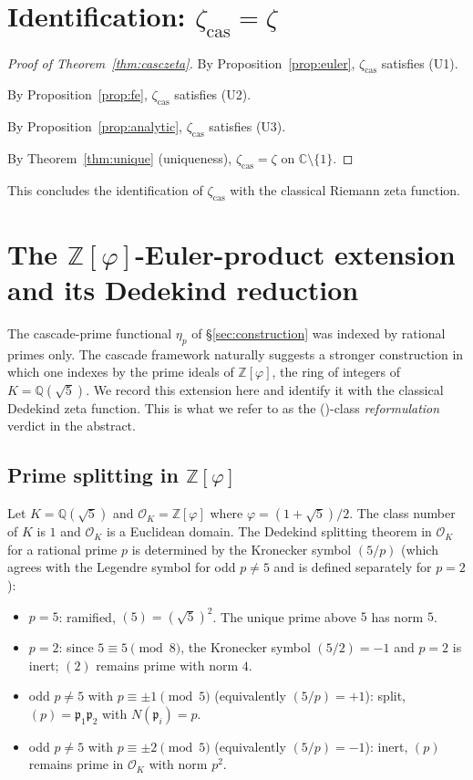 \documentclass[11pt, a4paper]{amsart}
\theoremstyle{definition}
\newcommand{\Z}{\mathbb{Z}}
\newcommand{\Q}{\mathbb{Q}}
\newcommand{\C}{\mathbb{C}}
\newcommand{\pphi}{\varphi}
\newcommand{\zetacas}{\zeta_{\mathrm{cas}}}
\begin{document}
\section{Identification: $\zetacas = \zeta$}\label{sec:identity}

\begin{proof}[Proof of Theorem~\ref{thm:casczeta}]
By Proposition~\ref{prop:euler}, $\zetacas$ satisfies (U1).

By Proposition~\ref{prop:fe}, $\zetacas$ satisfies (U2).

By Proposition~\ref{prop:analytic}, $\zetacas$ satisfies (U3).

By Theorem~\ref{thm:unique} (uniqueness), $\zetacas = \zeta$ on
$\C \setminus \{1\}$.
\end{proof}

This concludes the identification of $\zetacas$ with the classical
Riemann zeta function.

\section{The $\Z[\pphi]$-Euler-product extension and its Dedekind reduction}\label{sec:zetaK}

The cascade-prime functional $\eta_p$ of \S\ref{sec:construction}
was indexed by rational primes only. The cascade framework
naturally suggests a stronger construction in which one indexes by
the prime ideals of $\Z[\pphi]$, the ring of integers of
$K = \Q(\sqrt{5})$. We record this extension here and identify it
with the classical Dedekind zeta function. This is what we refer
to as the (\textdelta)-class \emph{reformulation} verdict in the
abstract.

\subsection{Prime splitting in $\Z[\pphi]$}

Let $K = \Q(\sqrt{5})$ and $\mathcal{O}_K = \Z[\pphi]$ where
$\pphi = (1+\sqrt{5})/2$. The class number of $K$ is $1$ and
$\mathcal{O}_K$ is a Euclidean domain. The Dedekind splitting
theorem in $\mathcal{O}_K$ for a rational prime $p$ is determined
by the Kronecker symbol $(5/p)$ (which agrees with the Legendre
symbol for odd $p \neq 5$ and is defined separately for $p = 2$):
\begin{itemize}
\item $p = 5$: ramified, $(5) = (\sqrt{5})^2$. The unique prime
  above $5$ has norm $5$.
\item $p = 2$: since $5 \equiv 5 \pmod 8$, the Kronecker symbol
  $(5/2) = -1$ and $p=2$ is inert; $(2)$ remains prime with
  norm $4$.
\item odd $p \neq 5$ with $p \equiv \pm 1 \pmod 5$ (equivalently
  $(5/p) = +1$): split, $(p) = \mathfrak{p}_1 \mathfrak{p}_2$ with
  $N(\mathfrak{p}_i) = p$.
\item odd $p \neq 5$ with $p \equiv \pm 2 \pmod 5$ (equivalently
  $(5/p) = -1$): inert, $(p)$ remains prime in $\mathcal{O}_K$
  with norm $p^2$.
\end{itemize}
\end{document}
